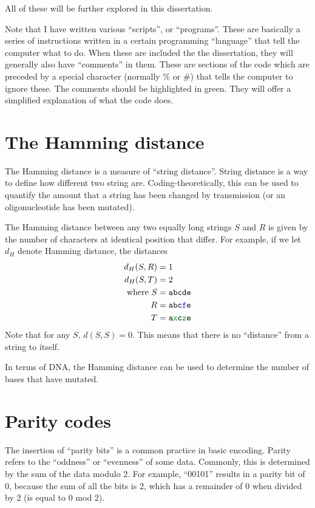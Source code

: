 \documentclass{article}
\begin{document}
    All of these will be further explored in this dissertation.

    Note that I have written various ``scripts'', or ``programs''. These are
    basically a series of instructions written in a certain programming
    ``language'' that tell the computer what to do. When these are included the
    the dissertation, they will generally also have ``comments'' in them. These
    are sections of the code which are preceded by a special character (normally
    \% or \#) that tells the computer to ignore these. The comments should be
    highlighted in green. They will offer a simplified explanation of what the
    code does.

    \section{The Hamming distance}

    The Hamming distance is a measure of ``string distance''. String
    distance is a way to define how different two string are.
    Coding-theoretically, this can be used to quantify the amount that a
    string has been changed by transmission (or an oligonucleotide has been
    mutated).

    The Hamming distance between any two equally long strings $S$ and $R$
    is given by the number of characters at identical position that differ.
    For example, if we let $d_H$ denote Hamming distance, the distances
    \begin{align*}
    d_H(S, R) &= 1\\
    d_H(S, T) &= 2\\
    \text{where}\
    S &= \texttt{abcde}\\
    R &= \texttt{abc\textcolor{blue}{f}e}\\
    T &= \texttt{a\textcolor{codegreen}{x}c\textcolor{codegreen}{z}e}
    \end{align*}
    Note that for any $S$, $d(S, S) = 0$. This means that there is no
    ``distance'' from a string to itself.

    In terms of DNA, the Hamming distance can be used to determine the
    number of bases that have mutated.


    \section{Parity codes}

    The insertion of ``parity bits'' is a common practice in basic encoding.
    Parity refers to the ``oddness'' or ``evenness'' of some data. Commonly,
    this is determined by the sum of the data modulo 2. For example, ``00101''
    results in a parity bit of 0, because the sum of all the bits is 2, which
    has a remainder of 0 when divided by 2 (is equal to 0 mod 2).
\end{document}
